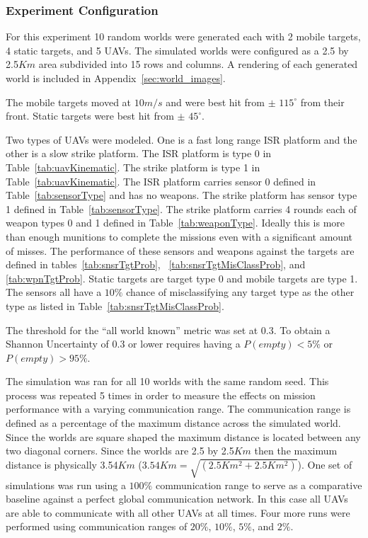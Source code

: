 \subsubsection{Experiment Configuration}
For this experiment 10 random worlds were generated each with 2 mobile targets, 4 static targets, and 5 UAVs.  The simulated worlds were configured as a 2.5 by 2.5$Km$ area subdivided into 15 rows and columns.  A rendering of each generated world is included in Appendix~\ref{sec:world_images}.

The mobile targets moved at $10m/s$ and were best hit from $\pm$ $115^{\circ}$ from their front.  Static targets were best hit from $\pm$ $45^{\circ}$.

Two types of UAVs were modeled.  One is a fast long range ISR platform and the other is a slow strike platform.  The ISR platform is type 0 in Table~\ref{tab:uavKinematic}.  The strike platform is type 1 in Table~\ref{tab:uavKinematic}.  The ISR platform carries sensor 0 defined in Table~\ref{tab:sensorType} and has no weapons.  The strike platform has sensor type 1 defined in Table~\ref{tab:sensorType}.  The strike platform carries 4 rounds each of weapon types 0 and 1 defined in Table~\ref{tab:weaponType}.  Ideally this is more than enough munitions to complete the missions even with a significant amount of misses.  The performance of these sensors and weapons against the targets are defined in tables~\ref{tab:snsrTgtProb}, ~\ref{tab:snsrTgtMisClassProb}, and \ref{tab:wpnTgtProb}.  Static targets are target type 0 and mobile targets are type 1.  The sensors all have a $10\%$ chance of misclassifying any target type as the other type as listed in Table~\ref{tab:snsrTgtMisClassProb}.

The threshold for the ``all world known'' metric was set at 0.3. To obtain a Shannon Uncertainty of 0.3 or lower requires having a $P(empty) < 5\%$ or $P(empty) > 95\%$.

The simulation was ran for all 10 worlds with the same random seed.  This process was repeated 5 times in order to measure the effects on mission performance with a varying communication range.  The communication range is defined as a percentage of the maximum distance across the simulated world.  Since the worlds are square shaped the maximum distance is located between any two diagonal corners.  Since the worlds are 2.5 by 2.5$Km$ then the maximum distance is physically 3.54$Km$ ($3.54Km = \sqrt{(2.5Km^{2}+2.5Km^{2})}$).  One set of simulations was run using a $100\%$ communication range to serve as a comparative baseline against a perfect global communication network.  In this case all UAVs are able to communicate with all other UAVs at all times. Four more runs were performed using communication ranges of $20\%$, $10\%$, $5\%$, and $2\%$.
